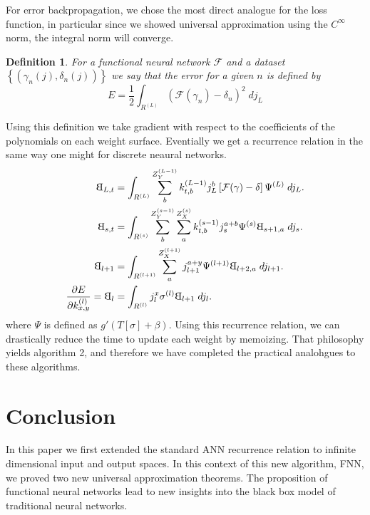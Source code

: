 \documentclass{article}
\newtheorem{definition}[theorem]{Definition}
\newcommand{\rotB}{\scalebox{-1}[1]{B}}
\begin{document}
    For error backpropagation, we chose the most direct analogue for the loss function, in particular since we showed universal approximation using the $C^\infty$ norm, the integral norm will converge. 
\begin{definition}
    For a functional neural network $\mathcal{F}$ and a dataset $\left\{(\gamma_n(j), \delta_n(j))\right\}$ we say that the error for a given $n$ is defined by
    \begin{equation} \label{eq:error}
        E = \frac12 \int_{R^{(L)}}\left(\mathcal{F}(\gamma_n) - \delta_n \right)^2\;dj_L
    \end{equation}
\end{definition}
Using this definition we take gradient with respect to the coefficients of the polynomials on each weight surface. Eventially we get a recurrence relation in the same way one might for discrete neaural networks.
\begin{equation} \label{eq:rotBrelation}
  \begin{aligned}
    \rotB_{L,t} &= \int_{R^{(L)}}  \sum_b^{Z^{(L-1)}_Y} k^{(L-1)}_{t,b} j_L^b 
      \left[\mathcal{F}(\gamma) - \delta\right] \Psi^{(L)}\;dj_L. \\
    \rotB_{s,t} &= \int_{R^{(s)}}\sum_b^{Z^{(s-1)}_Y} \sum_a^{Z^{(s)}_X} 
      k^{(s-1)}_{t,b} j_s^{a+b} \Psi^{(s)} \rotB_{s+1,a}\; dj_s. \\
    \rotB_{l+1} &= \int_{R^{(l+1)}} \sum_a^{Z^{(l+1)}_X}
      j^{a+y}_{l+1} \Psi^{(l+1)} \rotB_{l+2, a}\; dj_{l+1}. \\
     \frac{\partial E}{\partial k^{(l)}_{x,y}} = \rotB_{l} &= \int_{R^{(l)}}
      j_{l}^x \sigma^{(l)} \rotB_{l+1}\; dj_l.
  \end{aligned}
  \end{equation}
  where $\Psi$ is defined as $g'(T[\sigma]+\beta).$ Using this recurrence relation, we can drastically reduce the time to update each weight by memoizing. That philosophy yields algorithm 2, and therefore we have completed the practical analohgues to these algorithms.

\section{Conclusion}
In this paper we first extended the standard ANN recurrence relation to infinite dimensional input and output spaces. In this context of this new algorithm, FNN, we proved two new universal approximation theorems. The proposition of functional neural networks lead to new insights into the black box model of traditional neural networks.
\end{document}
